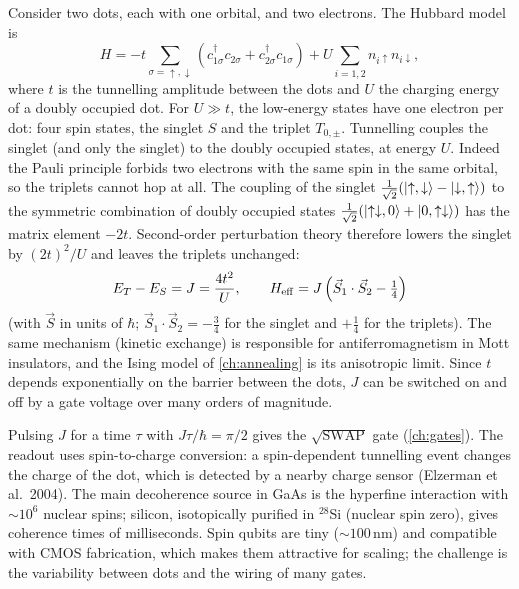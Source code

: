 \begin{origin}
Consider two dots, each with one orbital, and two electrons. The Hubbard model is
\begin{equation}
  H=-t\sum_{\sigma=\uparrow,\downarrow}\left(c_{1\sigma}^\dagger c_{2\sigma}+c_{2\sigma}^\dagger c_{1\sigma}\right)+U\sum_{i=1,2}n_{i\uparrow}n_{i\downarrow},
\end{equation}
where $t$ is the tunnelling amplitude between the dots and $U$ the charging energy of a doubly occupied dot. For $U\gg t$, the low-energy states have one electron per dot: four spin states, the singlet $S$ and the triplet $T_{0,\pm}$. Tunnelling
couples the singlet (and only the singlet) to the doubly occupied states, at energy $U$. Indeed the Pauli principle forbids two electrons with the same spin in the same orbital, so the triplets cannot hop at all. The coupling of the singlet
$\frac1{\sqrt2}(\left|\uparrow,\downarrow\right\rangle-\left|\downarrow,\uparrow\right\rangle)$ to the symmetric combination of doubly occupied states $\frac1{\sqrt2}(\left|\uparrow\downarrow,0\right\rangle+\left|0,\uparrow\downarrow\right\rangle)$ has the matrix element $-2t$. Second-order perturbation
theory therefore lowers the singlet by $(2t)^2/U$ and leaves the triplets unchanged:
\begin{equation}
  E_T-E_S=J=\frac{4t^2}U,\qquad H_{\rm eff}=J\left(\vec S_1\cdot\vec S_2-\tfrac14\right)
\end{equation}
(with $\vec S$ in units of $\hbar$; $\vec S_1\cdot\vec S_2=-\frac34$ for the singlet and $+\frac14$ for the triplets). The same mechanism (kinetic exchange) is responsible for antiferromagnetism in Mott insulators, and the Ising model of \cref{ch:annealing}
is its anisotropic limit. Since $t$ depends exponentially on the barrier between the dots, $J$ can be switched on and off by a gate voltage over many orders of magnitude.
\end{origin}
Pulsing $J$ for a time $\tau$ with $J\tau/\hbar=\pi/2$ gives the $\sqrt{\mathrm{SWAP}}$ gate (\cref{ch:gates}). The readout uses spin-to-charge conversion: a spin-dependent tunnelling event changes the charge of the dot, which is detected by a nearby
charge sensor (Elzerman et al.\ 2004). The main decoherence source in GaAs is the hyperfine interaction with $\sim10^6$ nuclear spins; silicon, isotopically purified in $^{28}$Si (nuclear spin zero), gives coherence times of milliseconds.
Spin qubits are tiny ($\sim100$\,nm) and compatible with CMOS fabrication, which makes them attractive for scaling; the challenge is the variability between dots and the wiring of many gates.


